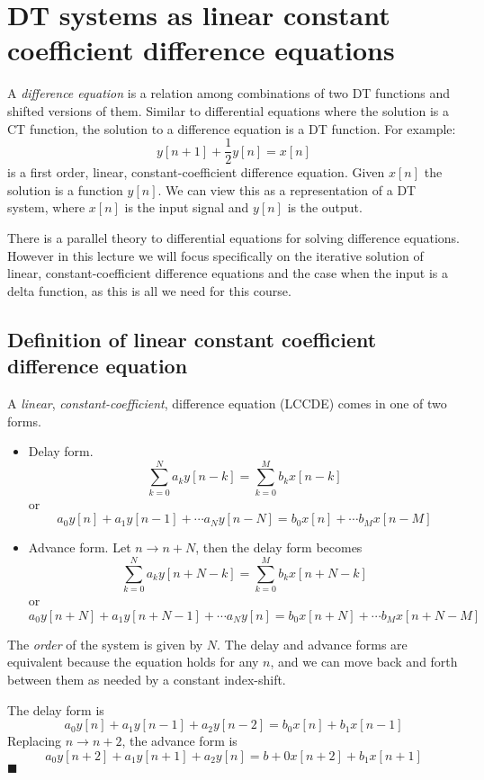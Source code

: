 \section{DT systems as linear constant coefficient difference equations}

A \emph{difference equation} is a relation among combinations of two DT functions and shifted versions of them. Similar to differential equations where the solution is a CT function, the solution to a difference equation is a DT function. For example:
\[                         
y[n+1] + \frac{1}{2}y[n] = x[n] 
\]
is a first order, linear, constant-coefficient difference equation. Given $x[n]$ the solution is a function $y[n]$. We can view this as a representation of a DT system, where $x[n]$ is the input signal and $y[n]$ is the output.

There is a parallel theory to differential equations for solving difference equations. However in this lecture we will focus specifically on the iterative solution of linear, constant-coefficient difference equations and the case when the input is a delta function, as this is all we need for this course.

\subsection{Definition of linear constant coefficient difference equation}

A \emph{linear}, \emph{constant-coefficient}, difference equation (LCCDE) comes in one of two forms.

\begin{itemize}
  \item Delay form. 
  \[    
  \sum\limits_{k = 0}^N a_k y[n-k] = \sum\limits_{k = 0}^M b_k x[n-k]
  \]
  or
  \[
  a_0y[n] + a_1y[n-1] + \cdots a_N y[n-N] = b_0 x[n] + \cdots b_Mx[n-M]
  \]
  
\item Advance form. Let $n\rightarrow n+N$, then the delay form becomes
  \[    
  \sum\limits_{k = 0}^N a_k y[n+N-k] = \sum\limits_{k = 0}^M b_k x[n+N-k]
  \]
  or 
  \[
  a_0y[n+N] + a_1y[n+N-1] + \cdots a_N y[n] = b_0 x[n+N] + \cdots b_Mx[n+N-M]
  \]
\end{itemize}

The {\it order} of the system is given by $N$. The delay and advance forms are equivalent because the equation holds for any $n$, and we can move back and forth between them as needed by a constant index-shift.

\begin{example}[$N=2$, $M=1$]
  The delay form is
  \[
  a_0y[n] + a_1 y[n-1] + a_2 y[n-2] = b_0 x[n] + b_1 x[n-1]
  \]
  Replacing $n \rightarrow n+2$, the advance form is
  \[
  a_0 y[n+2] + a_1 y[n+1] + a_2 y[n] = b+0 x[n+2] + b_1 x[n+1]
  \]
  $\blacksquare$
\end{example}

